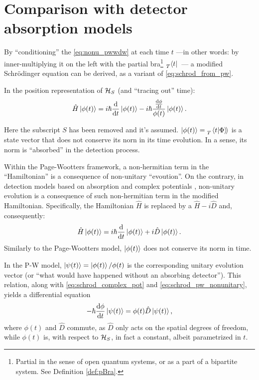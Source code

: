 \section{Comparison with detector absorption models}

By ``conditioning'' the \eqref{eq:nonu_pwwdw} at each time $t$
---in other words: by inner-multiplying it on the left with the partial bra\footnote{
  Partial in the sense of open quantum systems, or as a part of a bipartite system.
  See Definition \ref{def:pBra}.
}
$\prescript{}{T}{\bra{t}}$~---
a modified Schr{\"o}dinger equation
can be derived,
as a variant of \eqref{eq:schrod_from_pw}.

In the position representation of $\mathcal{H}_S$ (and ``tracing out'' time):
\begin{equation}\label{eq:schrod_pw_nonunitary}
  \hat{H} \ket{\phi(t)} = i\hbar\dv{t}\ket{\phi(t)} -i\hbar\frac{\dv{\phi}{t}}{\phi(t)}\ket{\phi(t)} \text{.}
\end{equation}

Here the subscript $S$ has been removed and it's assumed.
$\ket{\phi(t)} = \prescript{}{T}{\left.\left\langle t \middle| \Phi \right\rangle\!\right\rangle}$
is a state vector that does not conserve its norn in its time evolution.
In a sense, its norm is ``absorbed'' in the detection process.

Within the Page-Wootters framework, a non-hermitian term in the ``Hamiltonian''
is a consequence of non-unitary ``evoution''.
On the contrary, in detection models based on absorption and complex potentials
\parencite{RuschhauptAbsorption}, non-unitary evolution is a consequence
of such non-hermitian term in the modified Hamiltonian.
Specifically, the Hamiltonian $\hat{H}$ is replaced by a $\hat{H} - i\hat{D}$
and, consequently:
\begin{equation}\label{eq:schrod_complex_pot}
  \hat{H} \ket{\phi(t)} = i\hbar\dv{t}\ket{\phi(t)} +i\hat{D}\ket{\phi(t)} \text{.}
\end{equation}
Similarly to the Page-Wootters model, $\ket{\phi(t)}$ does not conserve its norm in time.

In the P-W model, $\ket{\psi(t)} = \ket{\phi(t)}/\phi(t)$
is the corresponding unitary evolution vector
(or ``what would have happened without an absorbing detector'').
This relation, along with \eqref{eq:schrod_complex_pot} and \eqref{eq:schrod_pw_nonunitary},
yields a differential equation
\begin{equation}\label{eq:phi_diffeq}
  -\hbar\dv{\phi}{t}\ket{\psi(t)} = \phi(t) \hat{D} \ket{\psi(t)} \text{,}
\end{equation}
where $\phi(t)$ and $\hat{D}$ commute, as $\hat{D}$ only acts on the spatial degrees of freedom,
while $\phi(t)$ is, with respect to $\mathcal{H}_S$, in fact a constant, albeit parametrized in $t$.

